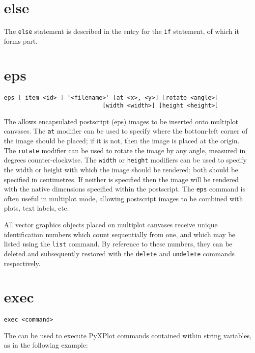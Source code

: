\section{else}

The {\tt else} statement is described in the entry for the {\tt if}
statement, of which it forms part.


\section{eps}

\begin{verbatim}
eps [ item <id> ] '<filename>' [at <x>, <y>] [rotate <angle>]
                            [width <width>] [height <height>]
\end{verbatim}

The  allows encapsulated postscript (eps) images to be inserted
onto multiplot canvases.  The {\tt at} modifier can be used to specify where
the bottom-left corner of the image should be placed; if it is not, then the
image is placed at the origin. The {\tt rotate} modifier can be used to rotate
the image by any angle, measured in degrees counter-clockwise.  The {\tt width}
or {\tt height} modifiers can be used to specify the width or height with which
the image should be rendered; both should be specified in centimetres. If
neither is specified then the image will be rendered with the native dimensions
specified within the postscript.  The {\tt eps} command is often useful in
multiplot mode, allowing postscript images to be combined with plots, text
labels, etc.

All vector graphics objects placed on multiplot canvases receive unique
identification numbers which count sequentially from one, and which may be
listed using the {\tt list} command.  By reference to these numbers, they can
be deleted and subsequently restored with the {\tt delete} and {\tt undelete}
commands respectively.


\section{exec}

\begin{verbatim}
exec <command>
\end{verbatim}

The  can be used to execute PyXPlot commands contained within
string variables, as in the following example:


